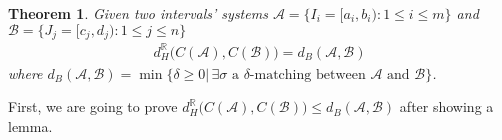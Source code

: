 \documentclass[a4paper,12pt]{article}
\newtheorem{theorem}{Theorem}[section]
\newcommand{\woojin}[1]           {{ \textcolor{darkblue} {#1}}}
\newcommand{\facundo}[1]                {{ \textcolor{darkred} {#1}}}
\DeclarePairedDelimiter{\abs}{\lvert}{\rvert}
\begin{document}
\begin{theorem}\label{stability}
Given two intervals' systems $\mathcal{A}=\{I_i=[a_i,b_i):  1\leq i \leq m\}$ and $\mathcal{B}=\{J_j=[c_j,d_j): 1\leq j \leq n\}$ 
\begin{align*}
d_{H}^\mathbb{R}\big(C(\mathcal{A}) ,C(\mathcal{B})\big)= d_B(\mathcal{A}, \mathcal{B})
\end{align*}
where $d_B(\mathcal{A}, \mathcal{B})=\min\{\delta\geq 0|\,\exists \sigma\,\,\mbox{a $\delta$-matching between $\mathcal{A}$ and $\mathcal{B}$}\}$.
\end{theorem}



First, we are going to prove $d_{H}^\mathbb{R}\big(C(\mathcal{A}) ,C(\mathcal{B})\big)\leq d_B(\mathcal{A}, \mathcal{B})$  after showing a lemma. 
\end{document}
